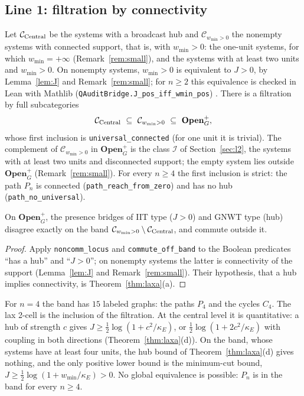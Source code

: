 \subsection{Line 1: filtration by connectivity}\label{sec:l1}
Let $\mathcal C_{\rm Central}$ be the systems with a broadcast hub and $\mathcal C_{w_{\min}>0}$ the nonempty systems with connected support, that is, with $w_{\min}>0$: the one-unit systems, for which $w_{\min}=+\infty$ (Remark~\ref{rem:small}), and the systems with at least two units and $w_{\min}>0$. On nonempty systems, $w_{\min}>0$ is equivalent to $J>0$, by Lemma~\ref{lem:J} and Remark~\ref{rem:small}; for $n\ge2$ this equivalence is checked in Lean with Mathlib (\texttt{QAuditBridge.J\_pos\_iff\_wmin\_pos}) \stM. There is a filtration by full subcategories
\begin{equation}
\mathcal C_{\rm Central}\ \subseteq\ \mathcal C_{w_{\min}>0}\ \subseteq\ \mathbf{Open}_G^{+},
\end{equation}
whose first inclusion is \texttt{universal\_connected} (for one unit it is trivial). The complement of $\mathcal C_{w_{\min}>0}$ in $\mathbf{Open}_G^{+}$ is the class $\mathcal I$ of Section~\ref{sec:l2}, the systems with at least two units and disconnected support; the empty system lies outside $\mathbf{Open}_G^{+}$ (Remark~\ref{rem:small}). For every $n\ge4$ the first inclusion is strict: the path $P_n$ is connected (\texttt{path\_reach\_from\_zero}) and has no hub (\texttt{path\_no\_universal}).
\begin{theorem}\label{thm:locus}
On $\mathbf{Open}_G^{+}$, the presence bridges of IIT type ($J>0$) and GNWT type (hub) disagree exactly on the band $\mathcal C_{w_{\min}>0}\setminus\mathcal C_{\rm Central}$, and commute outside it.
\end{theorem}
\begin{proof}
Apply \texttt{noncomm\_locus} and \texttt{commute\_off\_band} to the Boolean predicates ``has a hub'' and ``$J>0$''; on nonempty systems the latter is connectivity of the support (Lemma~\ref{lem:J} and Remark~\ref{rem:small}). Their hypothesis, that a hub implies connectivity, is Theorem~\ref{thm:laxa}(a).
\end{proof}
For $n=4$ the band has $15$ labeled graphs: the paths $P_4$ and the cycles $C_4$. The lax 2-cell is the inclusion of the filtration. At the central level it is quantitative: a hub of strength $c$ gives $J\ge\tfrac12\log(1+c^2/\kappa_E)$, or $\tfrac12\log(1+2c^2/\kappa_E)$ with coupling in both directions (Theorem~\ref{thm:laxa}(d)). On the band, whose systems have at least four units, the hub bound of Theorem~\ref{thm:laxa}(d) gives nothing, and the only positive lower bound is the minimum-cut bound, $J\ge\tfrac12\log(1+w_{\min}/\kappa_E)>0$. No global equivalence is possible: $P_n$ is in the band for every $n\ge4$.

